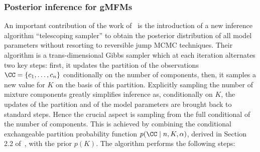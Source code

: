 \subsubsection*{Posterior inference for gMFMs}
An important contribution of the work of~\textcite{fruhwirthschnatter2020} is the introduction of a new inference algorithm ``telescoping sampler'' to obtain the posterior distribution of all model parameters without resorting to reversible jump MCMC techniques. Their algorithm is a trans-dimensional Gibbs sampler which at each iteration alternates two key steps: first, it updates the partition of the observations $\CC= \{c_1,\dots,c_n\}$ conditionally on the number of components, then, it samples a new value for $K$ on the basis of this partition.
Explicitly sampling the number of mixture components greatly simplifies inference as, conditionally on $K$, the updates of the partition and of the model parameters are brought back to standard steps.
%
Hence the crucial aspect is sampling from the full conditional of the number of components. This is achieved by combining the conditional exchangeable partition probability function $p(\CC \mid n, K, \alpha)$, derived in Section 2.2 of~\textcite{fruhwirthschnatter2020}, with the prior $p(K)$.
%
The algorithm performs the following steps:
